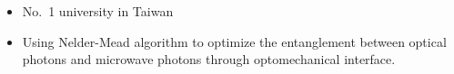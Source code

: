 \documentclass[10pt,a4paper,ragged2e,withhyper]{altacv}
\begin{document}
\begin{paracol}{2}
            \begin{itemize}
                \item No.~1 university in Taiwan
                \item Using Nelder-Mead algorithm to optimize the entanglement between optical photons and microwave photons through optomechanical interface.
            \end{itemize}
            \divider
            
    \end{paracol}
\end{document}
